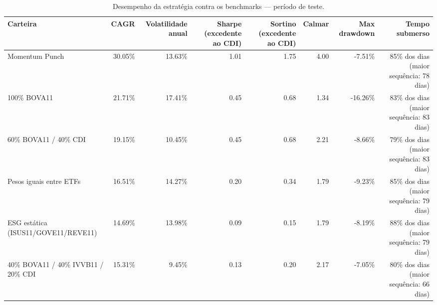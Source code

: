 \begin{table}[htbp]
\centering
\caption{Desempenho da estratégia contra os benchmarks — período de teste.}
\label{tab:performance-teste}
\begin{tabular}{lrrrrrrr}
\toprule
Carteira & CAGR & Volatilidade anual & Sharpe (excedente ao CDI) & Sortino (excedente ao CDI) & Calmar & Max drawdown & Tempo submerso \\
\midrule
Momentum Punch & 30.05\% & 13.63\% & 1.01 & 1.75 & 4.00 & -7.51\% & 85\% dos dias (maior sequência: 78 dias) \\
100\% BOVA11 & 21.71\% & 17.41\% & 0.45 & 0.68 & 1.34 & -16.26\% & 83\% dos dias (maior sequência: 83 dias) \\
60\% BOVA11 / 40\% CDI & 19.15\% & 10.45\% & 0.45 & 0.68 & 2.21 & -8.66\% & 79\% dos dias (maior sequência: 83 dias) \\
Pesos iguais entre ETFs & 16.51\% & 14.27\% & 0.20 & 0.34 & 1.79 & -9.23\% & 85\% dos dias (maior sequência: 79 dias) \\
ESG estática (ISUS11/GOVE11/REVE11) & 14.69\% & 13.98\% & 0.09 & 0.15 & 1.79 & -8.19\% & 88\% dos dias (maior sequência: 79 dias) \\
40\% BOVA11 / 40\% IVVB11 / 20\% CDI & 15.31\% & 9.45\% & 0.13 & 0.20 & 2.17 & -7.05\% & 80\% dos dias (maior sequência: 66 dias) \\
\bottomrule
\end{tabular}
\end{table}
